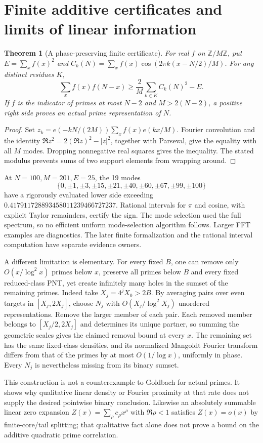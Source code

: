 \documentclass[11pt,a4paper]{article}
\newtheorem{theorem}{Theorem}[section]
\theoremstyle{definition}
\theoremstyle{remark}
\begin{document}
\section{Finite additive certificates and limits of linear information}\label{sec:certificates}
\begin{theorem}[A phase-preserving finite certificate]\label{thm:additive-certificate}
For real $f$ on $\mathbb Z/M\mathbb Z$, put $E=\sum_xf(x)^2$ and
$C_k(N)=\sum_xf(x)\cos(2\pi k(x-N/2)/M)$. For any distinct residues $K$,
\[\sum_xf(x)f(N-x)\ge\frac2M\sum_{k\in K}C_k(N)^2-E.\]
If $f$ is the indicator of primes at most $N-2$ and $M>2(N-2)$, a positive right side proves an actual prime representation of $N$.
\end{theorem}
\begin{proof}
Set $z_k=e(-kN/(2M))\sum_xf(x)e(kx/M)$. Fourier convolution and the identity $\Re z^2=2(\Re z)^2-|z|^2$, together with Parseval, give the equality with all $M$ modes. Dropping nonnegative real squares gives the inequality. The stated modulus prevents sums of two support elements from wrapping around.
\end{proof}
At $N=100,M=201,E=25$, the 19 modes
\[\{0,\pm1,\pm3,\pm15,\pm21,\pm40,\pm60,\pm67,\pm99,\pm100\}\]
have a rigorously evaluated lower side exceeding $0.417911728893458011239466727237$. Rational intervals for $\pi$ and cosine, with explicit Taylor remainders, certify the sign. The mode selection used the full spectrum, so no efficient uniform mode-selection algorithm follows. Larger FFT examples are diagnostics. The later finite formalization and the rational interval computation have separate evidence owners.

A different limitation is elementary. For every fixed $B$, one can remove only $O(x/\log^2x)$ primes below $x$, preserve all primes below $B$ and every fixed reduced-class PNT, yet create infinitely many holes in the sumset of the remaining primes. Indeed take $X_j=4^jX_0>2B$. By averaging pairs over even targets in $[X_j,2X_j]$, choose $N_j$ with $O(X_j/\log^2X_j)$ unordered representations. Remove the larger member of each pair. Each removed member belongs to $[X_j/2,2X_j]$ and determines its unique partner, so summing the geometric scales gives the claimed removal bound at every $x$. The remaining set has the same fixed-class densities, and its normalized Mangoldt Fourier transform differs from that of the primes by at most $O(1/\log x)$, uniformly in phase. Every $N_j$ is nevertheless missing from its binary sumset.

This construction is not a counterexample to Goldbach for actual primes. It shows why qualitative linear density or Fourier proximity at that rate does not supply the desired pointwise binary conclusion. Likewise an absolutely summable linear zero expansion $Z(x)=\sum_\rho c_\rho x^\rho$ with $\Re\rho<1$ satisfies $Z(x)=o(x)$ by finite-core/tail splitting; that qualitative fact alone does not prove a bound on the additive quadratic prime correlation.
\end{document}

